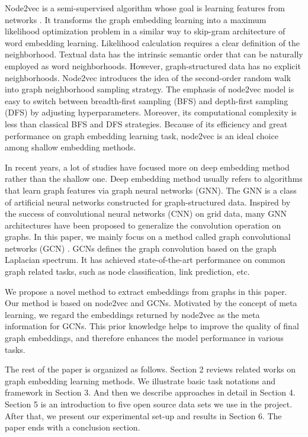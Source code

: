 \documentclass[sigconf]{acmart}
\begin{document}
Node2vec is a semi-supervised algorithm whose goal is learning features from networks \cite{node2vec}. It transforms the graph embedding learning into a maximum likelihood optimization problem in a similar way to skip-gram architecture of word embedding learning. Likelihood calculation requires a clear definition of the neighborhood. Textual data has the intrinsic semantic order that can be naturally employed as word neighborhoods. However, graph-structured data has no explicit neighborhoods. Node2vec introduces the idea of the second-order random walk into graph neighborhood sampling strategy. The emphasis of node2vec model is easy to switch between breadth-first sampling (BFS) and depth-first sampling (DFS) by adjusting hyperparameters. Moreover, its computational complexity is less than classical BFS and DFS strategies. Because of its efficiency and great performance on graph embedding learning task, node2vec is an ideal choice among shallow embedding methods.\par
In recent years, a lot of studies have focused more on deep embedding method rather than the shallow one. Deep embedding method usually refers to algorithms that learn graph features via graph neural networks (GNN). The GNN is a class of artificial neural networks constructed for graph-structured data. Inspired by the success of convolutional neural networks (CNN) on grid data, many GNN architectures have been proposed to generalize the convolution operation on graphs. In this paper, we mainly focus on a method called graph convolutional networks (GCN) \cite{gcn}. GCNs defines the graph convolution based on the graph Laplacian spectrum. It has achieved state-of-the-art performance on common graph related tasks, such as node classification, link prediction, etc.\par
We propose a novel method to extract embeddings from graphs in this paper. Our method is based on node2vec and GCNs. Motivated by the concept of meta learning, we regard the embeddings returned by node2vec as the meta information for GCNs. This prior knowledge helps to improve the quality of final graph embeddings, and therefore enhances the model performance in various tasks.\par
The rest of the paper is organized as follows. Section 2 reviews related works on graph embedding learning methods. We illustrate basic task notations and framework in Section 3. And then we describe approaches in detail in Section 4. Section 5 is an introduction to five open source data sets we use in the project. After that, we present our experimental set-up and results in Section 6. The paper ends with a conclusion section.  
\end{document}
